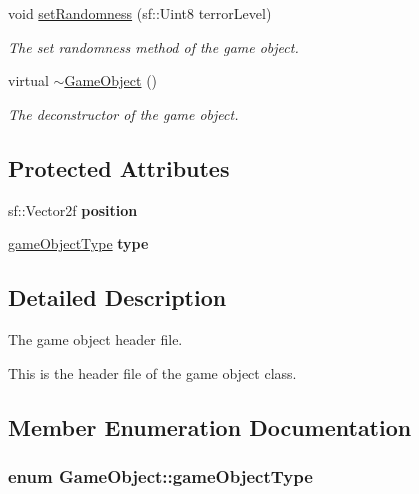 \begin{DoxyCompactItemize}
void \hyperlink{class_game_object_ac97158dbbf3f822668ab9497de63a773}{set\+Randomness} (sf\+::\+Uint8 terror\+Level)
\begin{DoxyCompactList}\small\item\em The set randomness method of the game object. \end{DoxyCompactList}\item 
virtual \hyperlink{class_game_object_ab82dfdb656f9051c0587e6593b2dda97}{$\sim$\+Game\+Object} ()
\begin{DoxyCompactList}\small\item\em The deconstructor of the game object. \end{DoxyCompactList}\end{DoxyCompactItemize}
\subsection*{Protected Attributes}
\begin{DoxyCompactItemize}
\item 
\hypertarget{class_game_object_a86e4253e3734436b4a5a0c503e0033b4}{sf\+::\+Vector2f {\bfseries position}}\label{class_game_object_a86e4253e3734436b4a5a0c503e0033b4}

\item 
\hypertarget{class_game_object_abca5290500e89ad2413aa7d512fa7a9c}{\hyperlink{class_game_object_ad5092169e581fb0772e01026882ea0c8}{game\+Object\+Type} {\bfseries type}}\label{class_game_object_abca5290500e89ad2413aa7d512fa7a9c}

\end{DoxyCompactItemize}


\subsection{Detailed Description}
The game object header file. 

This is the header file of the game object class. 

\subsection{Member Enumeration Documentation}
\hypertarget{class_game_object_ad5092169e581fb0772e01026882ea0c8}{
\subsubsection[{game\+Object\+Type}]{\setlength{\rightskip}{0pt plus 5cm}enum {\bf Game\+Object\+::game\+Object\+Type}}}\label{class_game_object_ad5092169e581fb0772e01026882ea0c8}


